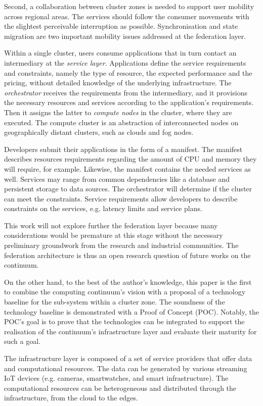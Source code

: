 Second, a collaboration between cluster zones is needed to support user mobility across regional areas. The services should follow the consumer movements with the slightest perceivable interruption as possible. Synchronisation and state migration are two important mobility issues addressed at the federation layer.

Within a single cluster, users consume applications that in turn contact an intermediary at the \textit{service layer}. Applications define the service requirements and constraints, namely the type of resource, the expected performance and the pricing, without detailed knowledge of the underlying infrastructure. The \textit{orchestrator} receives the requirements from the intermediary, and it provisions the necessary resources and services according to the application's requirements. Then it assigns the latter to \textit{compute nodes} in the cluster, where they are executed. The compute cluster is an abstraction of interconnected nodes on geographically distant clusters, such as clouds and fog nodes.

Developers submit their applications in the form of a manifest. The manifest describes resources requirements regarding the amount of CPU and memory they will require, for example. Likewise, the manifest contains the needed services as well. Services may range from common dependencies like a database and persistent storage to data sources. The orchestrator will determine if the cluster can meet the constraints. Service requirements allow developers to describe constraints on the services, e.g. latency limits and service plans.

This work will not explore further the federation layer because many considerations would be premature at this stage without the necessary preliminary groundwork from the research and industrial communities. The federation architecture is thus an open research question of future works on the continuum.

On the other hand, to the best of the author's knowledge, this paper is the first to combine the computing continuum's vision with a proposal of a technology baseline for the sub-system within a cluster zone. The soundness of the technology baseline is demonstrated with a Proof of Concept (POC). Notably, the POC's goal is to prove that the technologies can be integrated to support the realisation of the continuum's infrastructure layer and evaluate their maturity for such a goal.

The infrastructure layer is composed of a set of service providers that offer data and computational resources. The data can be generated by various streaming IoT devices (e.g. cameras, smartwatches, and smart infrastructure). The computational resources can be heterogeneous and distributed through the infrastructure, from the cloud to the edges.

